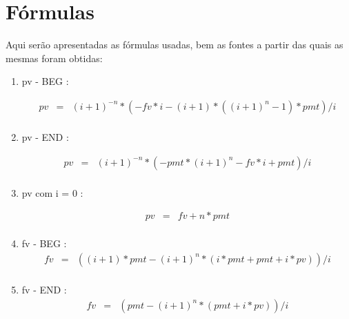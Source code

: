 \chapter{Fórmulas}

Aqui serão apresentadas as fórmulas usadas, bem as fontes a partir das quais as mesmas foram obtidas: \\

\begin{enumerate}
 \item pv - BEG \cite{arachnoid}:

\begin{eqnarray*}
pv &=& (i+1)^{-n} * ( -fv*i - (i+1) * ( (i+1)^{n} -1)*pmt  ) / i\\
\end{eqnarray*}


\item pv - END \cite{arachnoid}:

\begin{eqnarray*}
	pv &=& (i+1)^{-n} * ( -pmt*(i+1)^{n} - fv*i + pmt) / i \\
\end{eqnarray*}


\item pv com i = 0 \cite{matFinanceira}: 

\begin{eqnarray*}
  pv &=& fv + n * pmt  \\
\end{eqnarray*} 


\item fv - BEG \cite{arachnoid}:
\begin{eqnarray*}
 fv &=& ( (i+1)*pmt - (i+1)^{n}*(i*pmt + pmt + i*pv) ) / i \\
\end{eqnarray*}


\item fv - END \cite{arachnoid}: 
\begin{eqnarray*}
fv &=& ( pmt - (i+1)^{n} * (pmt + i*pv) ) / i \\
\end{eqnarray*}



\end{enumerate}

